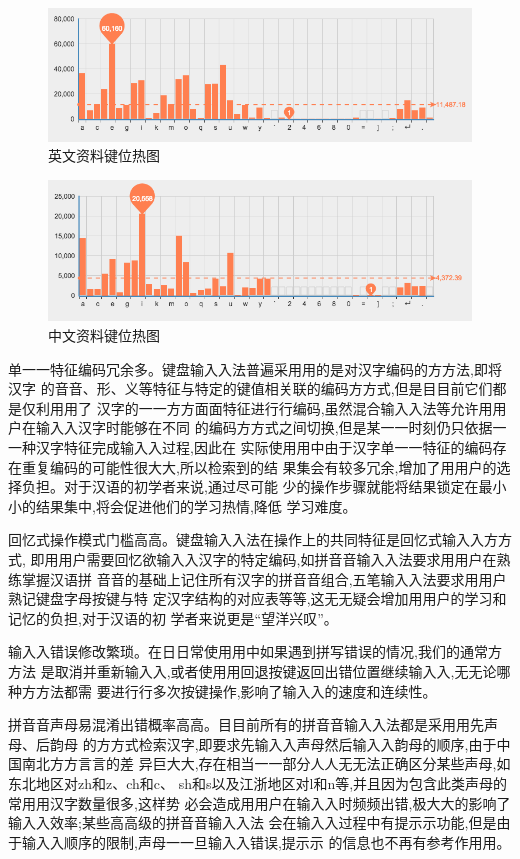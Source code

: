   \begin{figure}[h]
  \noindent\includegraphics[width=150mm]{img/stats_en}
  \caption{英文资料键位热图}
  \label{fig:stats_en}
  \end{figure}

  \begin{figure}[h]
  \noindent\includegraphics[width=150mm]{img/stats_cn}
  \caption{中文资料键位热图}
  \label{fig:stats_cn}
  \end{figure}
  单⼀一特征编码冗余多。键盘输⼊入法普遍采⽤用的是对汉字编码的⽅方法,即将汉字 的⾳音、形、义等特征与特定的键值相关联的编码⽅方式,但是⽬目前它们都是仅利⽤用了 汉字的⼀一⽅方⾯面特征进⾏行编码,虽然混合输⼊入法等允许⽤用户在输⼊入汉字时能够在不同 的编码⽅方式之间切换,但是某⼀一时刻仍只依据⼀一种汉字特征完成输⼊入过程,因此在 实际使⽤用中由于汉字单⼀一特征的编码存在重复编码的可能性很⼤大,所以检索到的结 果集会有较多冗余,增加了⽤用户的选择负担。对于汉语的初学者来说,通过尽可能 少的操作步骤就能将结果锁定在最⼩小的结果集中,将会促进他们的学习热情,降低 学习难度。

  回忆式操作模式门槛⾼高。键盘输⼊入法在操作上的共同特征是回忆式输⼊入⽅方式, 即⽤用户需要回忆欲输⼊入汉字的特定编码,如拼⾳音输⼊入法要求⽤用户在熟练掌握汉语拼 ⾳音的基础上记住所有汉字的拼⾳音组合,五笔输⼊入法要求⽤用户熟记键盘字母按键与特 定汉字结构的对应表等等,这⽆无疑会增加⽤用户的学习和记忆的负担,对于汉语的初 学者来说更是“望洋兴叹”。

  输⼊入错误修改繁琐。在⽇日常使⽤用中如果遇到拼写错误的情况,我们的通常⽅方法 是取消并重新输⼊入,或者使⽤用回退按键返回出错位置继续输⼊入,⽆无论哪种⽅方法都需 要进⾏行多次按键操作,影响了输⼊入的速度和连续性。

  拼⾳音声母易混淆出错概率⾼高。⽬目前所有的拼⾳音输⼊入法都是采⽤用先声母、后韵母 的⽅方式检索汉字,即要求先输⼊入声母然后输⼊入韵母的顺序,由于中国南北⽅方⾔言的差 异巨⼤大,存在相当⼀一部分⼈人⽆无法正确区分某些声母,如东北地区对zh和z、ch和c、 sh和s以及江浙地区对l和n等,并且因为包含此类声母的常⽤用汉字数量很多,这样势 必会造成⽤用户在输⼊入时频频出错,极⼤大的影响了输⼊入效率;某些⾼高级的拼⾳音输⼊入法 会在输⼊入过程中有提⽰示功能,但是由于输⼊入顺序的限制,声母⼀一旦输⼊入错误,提⽰示 的信息也不再有参考作⽤用。
